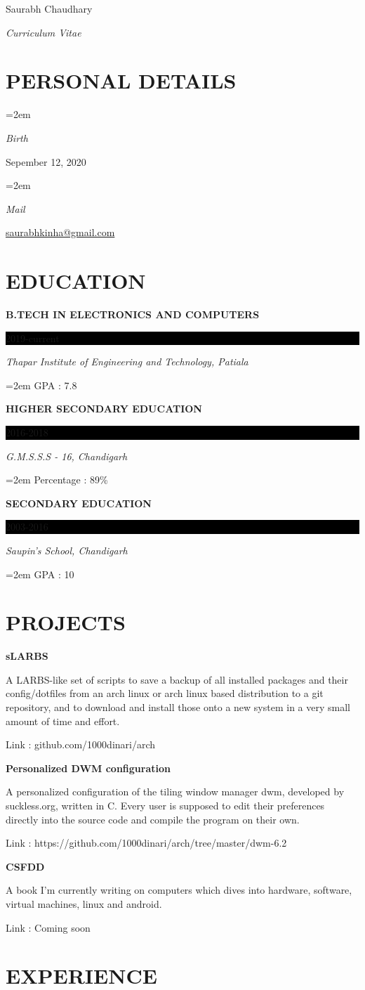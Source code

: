 \documentclass[paper=a4,fontsize=11pt]{scrartcl} %
\newlength{\spacebox}
\newcommand{\sepspace}{\vspace*{1em}}		%
\newcommand{\MyName}[1]{ %
		\Huge \usefont{OT1}{phv}{b}{n} \hfill #1
		\par \normalsize \normalfont}
\newcommand{\MySlogan}[1]{ %
		\large \usefont{OT1}{phv}{m}{n}\hfill \textit{#1}
		\par \normalsize \normalfont}
\newcommand{\NewPart}[1]{\section*{\uppercase{#1}}}
\newcommand{\PersonalEntry}[2]{
		\noindent\hangindent=2em\hangafter=0 %
		\parbox{\spacebox}{        %
		\textit{#1}}		       %
		\hspace{1.5em} #2 \par}    %
\newcommand{\EducationEntry}[4]{
		\noindent \textbf{#1} \hfill      %
		\colorbox{Black}{%
			\parbox{6em}{%
			\hfill\color{White}#2}} \par  %
		\noindent \textit{#3} \par        %
		\noindent \hangindent=2em\hangafter=0 \small #4 %
		\normalsize \par}
\newcommand{\ProjectsEntry}[3]{
		\noindent \textbf{#1} \hfill  \par    %
		\noindent \small #2 \par %
		\noindent \small #3 \par %
		\normalsize \par}
\begin{document}

\MyName{Saurabh Chaudhary}
\MySlogan{Curriculum Vitae}

\sepspace

\NewPart{Personal details}{}

\PersonalEntry{Birth}{Sepember 12, 2020}
\PersonalEntry{Mail}{\url{saurabhkinha@gmail.com}}

\NewPart{Education}{}

\EducationEntry{B.TECH IN ELECTRONICS AND COMPUTERS}{2019-current}{Thapar Institute of Engineering and Technology, Patiala}{GPA : 7.8}
\sepspace

\EducationEntry{HIGHER SECONDARY EDUCATION}{2016-2018}{G.M.S.S.S - 16, Chandigarh}{Percentage : 89\%}
\sepspace

\EducationEntry{SECONDARY EDUCATION}{2003-2016}{Saupin's School, Chandigarh}{GPA : 10}


\NewPart{Projects}{}

\ProjectsEntry{sLARBS}{A LARBS-like set of scripts to save a backup of all installed packages and their config/dotfiles from an arch linux or arch linux based distribution to a git repository, and to download and install those onto a new system in a very small amount of time and effort.}{Link : github.com/1000dinari/arch}
\sepspace

\ProjectsEntry{Personalized DWM configuration}{A personalized configuration of the tiling window manager dwm, developed by suckless.org, written in C. Every user is supposed to edit their preferences directly into the source code and compile the program on their own.}{Link : https://github.com/1000dinari/arch/tree/master/dwm-6.2}
\sepspace

\ProjectsEntry{CSFDD}{A book I'm currently writing on computers which dives into hardware, software, virtual machines, linux and android.}{Link : Coming soon}
\newpage

\NewPart{Experience}{}
\end{document}
